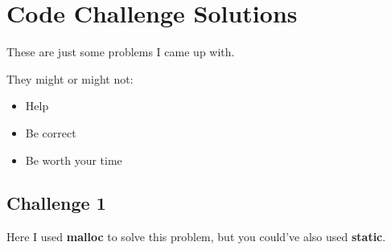 \documentclass{article}
\begin{document}
\clearpage
\section{Code Challenge Solutions}
These are just some problems I came up with. 

They might or might not:
\begin{itemize}
    \item Help
    \item Be correct
    \item Be worth your time
\end{itemize}
\subsection{Challenge 1}
Here I used \textbf{malloc} to solve this problem, but you could've also used \textbf{static}.
\end{document}
